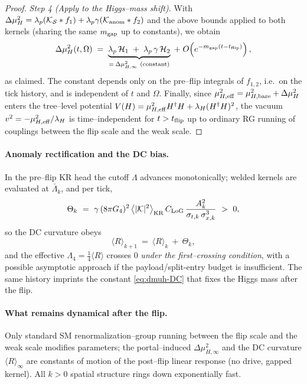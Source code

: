 \documentclass[10pt]{article}
\theoremstyle{definition}
\theoremstyle{plain}
\begin{document}
\begin{proof}
\emph{Step 4 (Apply to the Higgs–mass shift).} With $\Delta\mu_H^2=\lambda_p(\mathcal K_{\mathcal S}*f_1)+\lambda_p\gamma(\mathcal K_{\rm anom}*f_2)$ and the above bounds applied to both kernels (sharing the same $m_{\rm gap}$ up to constants), we obtain
\[
\Delta\mu_H^2(t,\Omega)\;=\;\underbrace{\lambda_p\,\mathcal H_1\;+\;\lambda_p\,\gamma\,\mathcal H_2}_{=\:\Delta\mu_{H,\infty}^2\ \text{(constant)}}\;+\;O\!\left(e^{-m_{\rm gap}(t-t_{\rm flip})}\right),
\]
as claimed. The constant depends only on the pre–flip integrals of $f_{1,2}$, i.e.\ on the tick history, and is independent of $t$ and $\Omega$. Finally, since $\mu_{H,{\rm eff}}^2=\mu_{H,{\rm bare}}^2+\Delta\mu_H^2$ enters the tree–level potential $V(H)=\mu_{H,{\rm eff}}^2 H^\dagger H + \lambda_H (H^\dagger H)^2$, the vacuum $v^2=-\mu_{H,{\rm eff}}^2/\lambda_H$ is time–independent for $t>t_{\rm flip}$ up to ordinary RG running of couplings between the flip scale and the weak scale. 
\end{proof}

\paragraph{Anomaly rectification and the DC bias.}\label{par:uom-main-129}
In the pre--flip KR head the cutoff $\Lambda$ advances monotonically; welded kernels are evaluated at
$\bar\Lambda_k$, and per tick,
\[
\Theta_k\ =\ \gamma\,(8\pi G_4)^2\,\big\langle|\mathcal K|^2\big\rangle_{\rm KR}\,C_{\rm LoG}\,
\frac{A_k^2}{\sigma_{t,k}\,\sigma_{x,k}^3}\ >\ 0,
\]
so the DC curvature obeys
\[
\langle R\rangle_{k+1}\ =\ \langle R\rangle_k\ +\ \Theta_k,
\]
and the effective $\Lambda_4=\tfrac14\langle R\rangle$ crosses $0$ \emph{under the first--crossing condition},
with a possible asymptotic approach if the payload/split-entry budget is insufficient.
The same history imprints the constant \eqref{eq:dmuh-DC} that fixes the Higgs mass after the flip.

\paragraph{What remains dynamical after the flip.}\label{par:uom-main-130}
Only standard SM renormalization–group running between the flip scale and the weak scale modifies parameters; the portal–induced $\Delta\mu_{H,\infty}^2$ and the DC curvature $\langle R\rangle_{\infty}$ are constants of motion of the post–flip linear response (no drive, gapped kernel). All $k>0$ spatial structure rings down exponentially fast.
\end{document}
